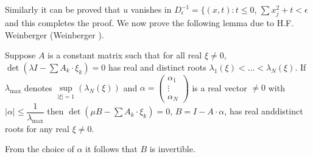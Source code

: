 Similarly it can be proved that $u$ vanishes in $D^{-1}_\epsilon=\{(x,
t): t\leq 0$, $\sum x_j^2 + t < \epsilon$ and this completes the
proof. We now prove the following lemma due to H.F. Weinberger
(Weinberger \cite{key1}). 


\setcounter{lemma}{0}
\begin{lemma}\label{chap3-sec7-lem1}%
Suppose $A$ is a constant matrix such that for all real $\xi \neq 0$,
$\det (\lambda I-\sum A_k \cdot  \xi_k) = 0$ has real and distinct roots
$\lambda_1 (\xi) <\ldots< \lambda_N(\xi)$. If $\lambda_{\max}$ denotes
$\sup\limits_{|\xi | = 1}( \lambda_N (\xi))$ and $\alpha =
\left(\begin{smallmatrix}\alpha_1\\ \vdots\\ \alpha_N \end{smallmatrix}\right)$
is a real vector $\neq 0$ with $| \alpha | \leq \dfrac{
  1}{\lambda_{\max}}$ then $\det (\mu B-\sum A_k \cdot  \xi _k) = 0$,
$B=I-A \cdot \alpha$, has real and\pageoriginale distinct roots for
any real $\xi \neq 0$. 
\end{lemma}

\begin{remark*}%
From the choice of $\alpha$ it follows that $B$ is invertible. 
\end{remark*}

